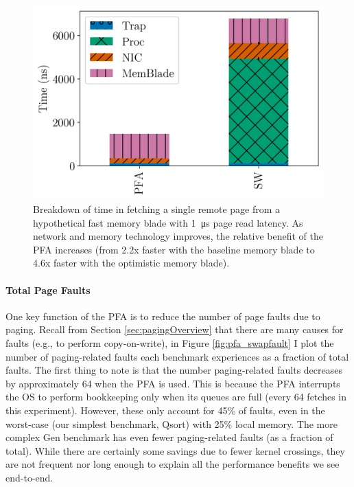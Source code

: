   \begin{figure}[h] \centering
    \includegraphics[width=0.6\columnwidth]{figs/fetch_breakdown_fastmem.png}
    \vspace{-5mm}
    \caption{Breakdown of time in fetching a single remote page from a
      hypothetical fast memory blade with \SI{1}{\micro\second} page read
      latency. As network and memory technology improves, the relative benefit
      of the PFA increases (from 2.2x faster with the baseline memory blade to
      4.6x faster with the optimistic memory blade).}
    \label{fig:fetch_breakdown}
  \end{figure}

  \paragraph{Total Page Faults}
  One key function of the PFA is to reduce the number of page faults due to
  paging. Recall from Section \ref{sec:pagingOverview} that there are many
  causes for faults (e.g., to perform copy-on-write), in Figure
  \ref{fig:pfa_swapfault} I plot the number of paging-related faults each
  benchmark experiences as a fraction of total faults. The first thing to note
  is that the number paging-related faults decreases by approximately 64 when
  the PFA is used. This is because the PFA interrupts the OS to perform
  bookkeeping only when its queues are full (every 64 fetches in this
  experiment). However, these only account for 45\% of faults, even in the
  worst-case (our simplest benchmark, Qsort) with 25\% local memory. The more
  complex Gen benchmark has even fewer paging-related faults (as a fraction of
  total). While there are certainly some savings due to fewer kernel crossings,
  they are not frequent nor long enough to explain all the performance benefits
  we see end-to-end.
 
